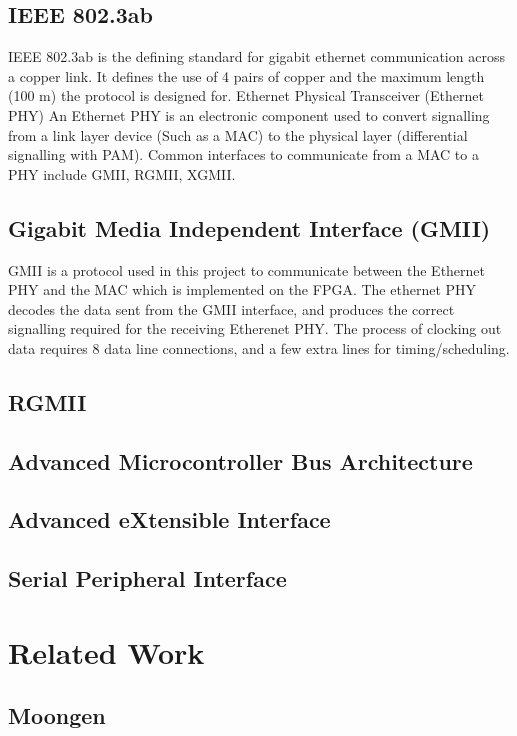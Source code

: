 \subsection{IEEE 802.3ab}
IEEE 802.3ab is the defining standard for gigabit ethernet communication across a copper link. It defines the use of 4 pairs of copper and the maximum length (100 m) the protocol is designed for.
Ethernet Physical Transceiver (Ethernet PHY)
An Ethernet PHY is an electronic component used to convert signalling from a link layer device (Such as a MAC) to the physical layer (differential signalling with PAM). Common interfaces to communicate from a MAC to a PHY include GMII, RGMII, XGMII.

\subsection{Gigabit Media Independent Interface (GMII)}
GMII is a protocol used in this project to communicate between the Ethernet PHY and the MAC which is implemented on the FPGA. The ethernet PHY decodes the data sent from the GMII interface, and produces the correct signalling required for the receiving Etherenet PHY. The process of clocking out data requires 8 data line connections, and a few extra lines for timing/scheduling.

\subsection{RGMII}

\subsection{Advanced Microcontroller Bus Architecture}

\subsection{Advanced eXtensible Interface}

\subsection{Serial Peripheral Interface}

\section{Related Work}

\subsection{Moongen}

